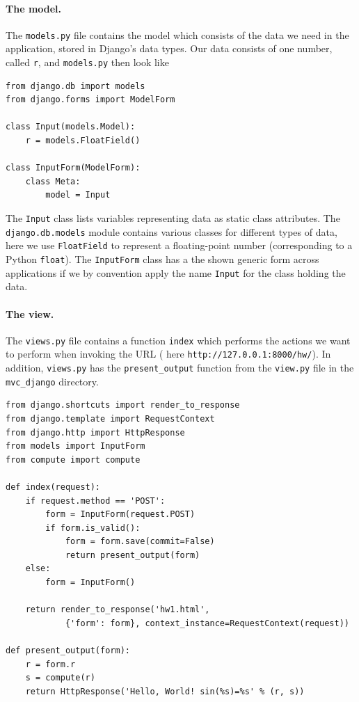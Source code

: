\documentclass[%
oneside,                 %
final,                   %
10pt]{article}
\begin{document}

\paragraph{The model.}
The \Verb!models.py! file contains the model which consists
of the data we need in the application, stored in Django's data types.
Our data consists of one number, called \Verb!r!, and \Verb!models.py! then
look like

\begin{Verbatim}[numbers=none,fontsize=\fontsize{9pt}{9pt},baselinestretch=0.85]
from django.db import models
from django.forms import ModelForm

class Input(models.Model):
    r = models.FloatField()

class InputForm(ModelForm):
    class Meta:
        model = Input
\end{Verbatim}
The \Verb!Input! class lists variables representing data as static class
attributes. The \Verb!django.db.models! module contains various classes
for different types of data, here we use \Verb!FloatField! to represent
a floating-point number (corresponding to a Python \Verb!float!).
The \Verb!InputForm! class has a the shown generic form across applications
if we by convention apply the name \Verb!Input! for the class holding the data.


\paragraph{The view.}
The \Verb!views.py! file contains a function \Verb!index! which performs
the actions we want to perform when invoking
the URL ( here \Verb!http://127.0.0.1:8000/hw/!).
In addition, \Verb!views.py! has the \Verb!present_output! function from
the \Verb!view.py! file in the \Verb!mvc_django! directory.

\begin{Verbatim}[numbers=none,fontsize=\fontsize{9pt}{9pt},baselinestretch=0.85]
from django.shortcuts import render_to_response
from django.template import RequestContext
from django.http import HttpResponse
from models import InputForm
from compute import compute

def index(request):
    if request.method == 'POST':
        form = InputForm(request.POST)
        if form.is_valid():
            form = form.save(commit=False)
            return present_output(form)
    else:
        form = InputForm()

    return render_to_response('hw1.html',
            {'form': form}, context_instance=RequestContext(request))

def present_output(form):
    r = form.r
    s = compute(r)
    return HttpResponse('Hello, World! sin(%s)=%s' % (r, s))
\end{Verbatim}
\end{document}
